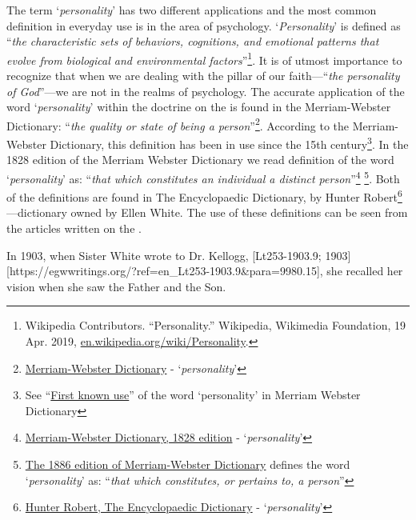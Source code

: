 The term ‘\textit{personality}’ has two different applications and the most common definition in everyday use is in the area of psychology. ‘\textit{Personality}’ is defined as “\textit{the characteristic sets of behaviors, cognitions, and emotional patterns that evolve from biological and environmental factors}”\footnote{Wikipedia Contributors. “Personality.” Wikipedia, Wikimedia Foundation, 19 Apr. 2019, \href{https://en.wikipedia.org/wiki/Personality}{en.wikipedia.org/wiki/Personality}.}. It is of utmost importance to recognize that when we are dealing with the pillar of our faith—“\textit{the personality of God}”—we are not in the realms of psychology. The accurate application of the word ‘\textit{personality}’ within the doctrine on the  is found in the Merriam-Webster Dictionary: “\textit{the quality or state of being a person}”\footnote{\href{https://www.merriam-webster.com/dictionary/personality}{Merriam-Webster Dictionary} - ‘\textit{personality}’}. According to the Merriam-Webster Dictionary, this definition has been in use since the 15th century\footnote{See “\href{https://www.merriam-webster.com/dictionary/personality\#word-history}{First known use}” of the word ‘personality’ in Merriam Webster Dictionary}. In the 1828 edition of the Merriam Webster Dictionary we read definition of the word ‘\textit{personality}’ as: “\textit{that which constitutes an individual a distinct person}”\footnote{\href{https://archive.org/details/americandictiona02websrich/page/272/mode/2up}{Merriam-Webster Dictionary, 1828 edition} - ‘\textit{personality}’} \footnote{\href{https://archive.org/details/websterscomplete00webs/page/974/mode/2up}{The 1886 edition of Merriam-Webster Dictionary} defines the word ‘\textit{personality}’ as: “\textit{that which constitutes, or pertains to, a person}”}. Both of the definitions are found in The Encyclopaedic Dictionary, by Hunter Robert\footnote{\href{https://babel.hathitrust.org/cgi/pt?id=mdp.39015050663213&view=1up&seq=780}{Hunter Robert, The Encyclopaedic Dictionary} - ‘\textit{personality}’}—dictionary owned by Ellen White. The use of these definitions can be seen from the articles written on the .

In 1903, when Sister White wrote to Dr. Kellogg, [Lt253-1903.9; 1903][https://egwwritings.org/?ref=en\_Lt253-1903.9&para=9980.15], she recalled her vision when she saw the Father and the Son.

